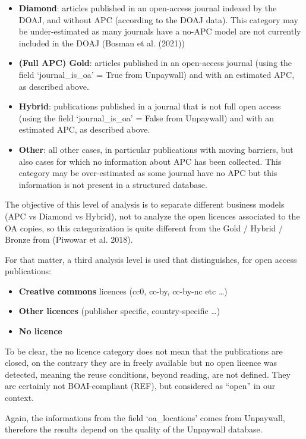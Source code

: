 \documentclass[
]{article}
\begin{document}
\begin{itemize}
\item
  \textbf{Diamond}: articles published in an open-access journal indexed
  by the DOAJ, and without APC (according to the DOAJ data). This
  category may be under-estimated as many journals have a no-APC model
  are not currently included in the DOAJ (Bosman et al. (2021))
\item
  \textbf{(Full APC) Gold}: articles published in an open-access journal
  (using the field `journal\_is\_oa' = True from Unpaywall) and with an
  estimated APC, as described above.
\item
  \textbf{Hybrid}: publications published in a journal that is not full
  open access (using the field `journal\_is\_oa' = False from Unpaywall)
  and with an estimated APC, as described above.
\item
  \textbf{Other}: all other cases, in particular publications with
  moving barriers, but also cases for which no information about APC has
  been collected. This category may be over-estimated as some journal
  have no APC but this information is not present in a structured
  database.
\end{itemize}

The objective of this level of analysis is to separate different
business models (APC vs Diamond vs Hybrid), not to analyze the open
licences associated to the OA copies, so this categorization is quite
different from the Gold / Hybrid / Bronze from (Piwowar et al. 2018).

For that matter, a third analysis level is used that distinguishes, for
open access publications:

\begin{itemize}
\item
  \textbf{Creative commons} licences (cc0, cc-by, cc-by-nc etc \ldots)
\item
  \textbf{Other licences} (publisher specific, country-specific \ldots)
\item
  \textbf{No licence}
\end{itemize}

To be clear, the no licence category does not mean that the publications
are closed, on the contrary they are in freely available but no open
licence was detected, meaning the reuse conditions, beyond reading, are
not defined. They are certainly not BOAI-compliant (REF), but considered
as ``open'' in our context.

Again, the informations from the field `oa\_locations' comes from
Unpaywall, therefore the results depend on the quality of the Unpaywall
database.
\end{document}
